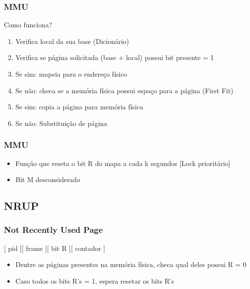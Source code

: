 \documentclass{beamer}
\begin{document}
\begin{frame}
\frametitle{MMU}
Como funciona?
\begin{enumerate}

\item Verifica local da sua base (Dicionário)

\item Verifica se página solicitada (base + local) possui bit presente = 1

\item Se sim: mapeia para o endereço físico

\item Se não:  checa se a memória física possui espaço para a página (First Fit)

\item Se sim: copia a página para memória física

\item Se não: Substituição de página

\end{enumerate}
\justifying
\end{frame}




\begin{frame}
\frametitle{MMU}
\begin{itemize}
\item Função que reseta o bit R do mapa a cada k segundos [Lock prioritário]

\item Bit M desconsiderado
\end{itemize}

\justifying
\end{frame}


\subsection{NRUP} 
\begin{frame}
\frametitle{Not Recently Used Page}

\begin{center}
[ pid ][ frame ][ bit R ][ contador ]
\end{center}

\begin{itemize}

\item Dentre as páginas presentes na memória física, checa qual deles possui R = 0

\item Caso todos os bits R’s = 1, espera resetar os bits R’s
\end{itemize}
\justifying
\end{frame}
\end{document}
